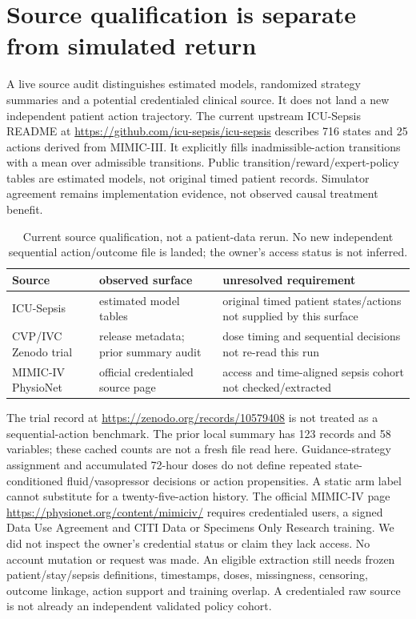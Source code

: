 \section{Source qualification is separate from simulated return}
A live source audit distinguishes estimated models, randomized strategy summaries and a potential credentialed clinical source. It does not land a new independent patient action trajectory. The current upstream ICU-Sepsis README at \url{https://github.com/icu-sepsis/icu-sepsis} describes 716 states and 25 actions derived from MIMIC-III. It explicitly fills inadmissible-action transitions with a mean over admissible transitions. Public transition/reward/expert-policy tables are estimated models, not original timed patient records. Simulator agreement remains implementation evidence, not observed causal treatment benefit.
\begin{table}[ht]\centering\small
\caption{Current source qualification, not a patient-data rerun. No new independent sequential action/outcome file is landed; the owner's access status is not inferred.}
\begin{tabular}{p{.23\linewidth}p{.29\linewidth}p{.38\linewidth}}\hline
Source & observed surface & unresolved requirement\\\hline
ICU-Sepsis & estimated model tables & original timed patient states/actions not supplied by this surface\\
CVP/IVC Zenodo trial & release metadata; prior summary audit & dose timing and sequential decisions not re-read this run\\
MIMIC-IV PhysioNet & official credentialed source page & access and time-aligned sepsis cohort not checked/extracted\\\hline
\end{tabular}\end{table}
The trial record at \url{https://zenodo.org/records/10579408} is not treated as a sequential-action benchmark. The prior local summary has 123 records and 58 variables; these cached counts are not a fresh file read here. Guidance-strategy assignment and accumulated 72-hour doses do not define repeated state-conditioned fluid/vasopressor decisions or action propensities. A static arm label cannot substitute for a twenty-five-action history.
The official MIMIC-IV page \url{https://physionet.org/content/mimiciv/} requires credentialed users, a signed Data Use Agreement and CITI Data or Specimens Only Research training. We did not inspect the owner's credential status or claim they lack access. No account mutation or request was made. An eligible extraction still needs frozen patient/stay/sepsis definitions, timestamps, doses, missingness, censoring, outcome linkage, action support and training overlap. A credentialed raw source is not already an independent validated policy cohort.
